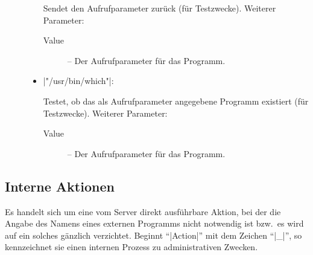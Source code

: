 \documentclass[%
fontsize=11pt
,paper=a4
,twoside
,headings=normal
,pagesize
]{scrartcl}
\begin{document}
\begin{description}
\begin{itemize}
      Sendet den Aufrufparameter zurück (für Testzwecke). Weiterer Parameter:
      \begin{description}

        \item[Value] -- Der Aufrufparameter für das Programm.

      \end{description}

    \item |"/usr/bin/which"|: \par

      Testet, ob das als Aufrufparameter angegebene Programm existiert (für
      Testzwecke). Weiterer Parameter:
      \begin{description}

        \item[Value] -- Der Aufrufparameter für das Programm.

      \end{description}

  \end{itemize}

\end{description}

\subsection*{Interne Aktionen}

  Es handelt sich um eine vom Server direkt ausführbare Aktion, bei der die
  Angabe des Namens eines externen Programms nicht notwendig ist bzw.\ es
  wird auf ein solches gänzlich verzichtet. Beginnt "`|Action|"' mit dem
  Zeichen "`|_|"', so kennzeichnet sie einen internen Prozess zu
  administrativen Zwecken.
\end{document}
